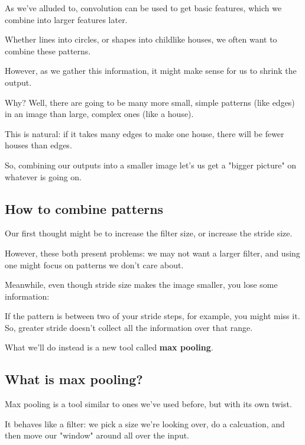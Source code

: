         As we've alluded to, convolution can be used to get basic features, which we combine into larger features later.
        
        Whether lines into circles, or shapes into childlike houses, we often want to combine these patterns.
        
        However, as we gather this information, it might make sense for us to shrink the output.
        
        Why? Well, there are going to be many more small, simple patterns (like edges) in an image than large, complex ones (like a house).
        
        This is natural: if it takes many edges to make one house, there will be fewer houses than edges.
        
        So, combining our outputs into a smaller image let's us get a "bigger picture" on whatever is going on.
        
    \subsection{How to combine patterns}
    
        Our first thought might be to increase the filter size, or increase the stride size.
        
        However, these both present problems: we may not want a larger filter, and using one might focus on patterns we don't care about.
        
        Meanwhile, even though stride size makes the image smaller, you lose some information:
        
        If the pattern is between two of your stride steps, for example, you might miss it. So, greater stride doesn't collect all the information over that range.
        
        What we'll do instead is a new tool called \textbf{max pooling}.
    
    \subsection{What is max pooling?}
    
        Max pooling is a tool similar to ones we've used before, but with its own twist.
        
        It behaves like a filter: we pick a size we're looking over, do a calcuation, and then move our "window" around all over the input.
        

